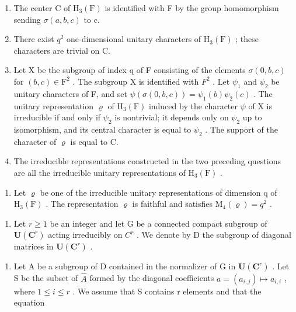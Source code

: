 \begin{enumerate}
\def\labelenumi{\alph{enumi})}
\item
  The center C of \(\mathrm{H}_{3}(\mathrm{F})\) is identified with F by the group homomorphism sending \(\sigma(a,b,c)\) to c.
\item
  There exist \(q^{2}\) one-dimensional unitary characters of \(\mathrm{H}_{3}(\mathrm{F})\) ; these characters are trivial on C.
\item
  Let X be the subgroup of index q of F consisting of the elements \(\sigma(0,b,c)\) for \((b,c)\in\mathrm{F}^{2}\) . The subgroup X is identified with \(F^{2}\) . Let \(\psi_{1}\) and \(\psi_{2}\) be unitary characters of F, and set \(\psi(\sigma(0,b,c))=\psi_{1}(b)\psi_{2}(c)\) . The unitary representation \(\varrho\) of \(\mathrm{H}_{3}(\mathrm{F})\) induced by the character \(\psi\) of X is irreducible if and only if \(\psi_{2}\) is nontrivial; it depends only on \(\psi_{2}\) up to isomorphism, and its central character is equal to \(\psi_{2}\) . The support of the character of \(\varrho\) is equal to C.
\item
  The irreducible representations constructed in the two preceding questions are all the irreducible unitary representations of \(\mathrm{H}_{3}(\mathrm{F})\) .
\end{enumerate}

\begin{enumerate}
\def\labelenumi{\alph{enumi})}
\setcounter{enumi}{4}
\tightlist
\item
  Let \(\varrho\) be one of the irreducible unitary representations of dimension q of \(\mathrm{H}_{3}(\mathrm{F})\) . The representation \(\varrho\) is faithful and satisfies \(\mathrm{M}_{4}(\varrho)=q^{2}\) .
\end{enumerate}

\begin{enumerate}
\def\labelenumi{\arabic{enumi})}
\setcounter{enumi}{15}
\tightlist
\item
  Let \(r \geqslant 1\) be an integer and let G be a connected compact subgroup of \(\mathbf{U}(\mathbf{C}^{r})\) acting irreducibly on \(C^{r}\) . We denote by D the subgroup of diagonal matrices in \(\mathbf{U}(\mathbf{C}^{r})\) .
\end{enumerate}

\begin{enumerate}
\def\labelenumi{\alph{enumi})}
\tightlist
\item
  Let A be a subgroup of D contained in the normalizer of G in \(\mathbf{U}(\mathbf{C}^{r})\) . Let S be the subset of \(\widehat{A}\) formed by the diagonal coefficients \(a = (a_{i,j}) \mapsto a_{i,i}\) , where \(1 \leqslant i \leqslant r\) . We assume that S contains r elements and that the equation
\end{enumerate}


